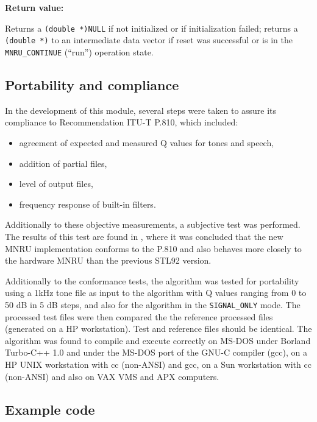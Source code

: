 {\bf Return value: }

Returns a {\tt (double *)NULL} if not initialized or if initialization failed; returns a {\tt (double *)} to an
intermediate data vector if reset was successful or is in the {\tt MNRU\_CONTINUE} (``run'') operation state.


\subsection{Portability and compliance} \label{MNRU-Tests}

In the development of this module, several steps were taken to assure its compliance to Recommendation ITU-T P.810, which included:

\begin{itemize}
  \item agreement of expected and measured Q values for tones and speech,
  \item addition of partial files,
  \item level of output files,
  \item frequency response of built-in filters.
\end{itemize}

Additionally to these objective measurements, a subjective test was performed.
The results of this test are found in \cite{Duo-MNRU}, where it was concluded that the new MNRU implementation conforms
to the P.810 and also behaves more closely to the hardware MNRU than the previous STL92 version.

Additionally to the conformance tests, the algorithm was tested for portability using a 1kHz tone file as input to the
algorithm with Q values ranging from 0 to 50 dB in 5 dB steps, and also for the algorithm in the {\tt SIGNAL\_ONLY} mode.
The processed test files were then compared the the reference processed files (generated on a HP workstation). Test and
reference files should be identical.
The algorithm was found to compile and execute correctly on MS-DOS under Borland Turbo-C++ 1.0 and under the MS-DOS port
of the GNU-C compiler (gcc), on a HP UNIX workstation with cc (non-ANSI) and gcc, on a Sun workstation with cc (non-ANSI)
and also on VAX VMS and APX computers.


\subsection{Example code}

